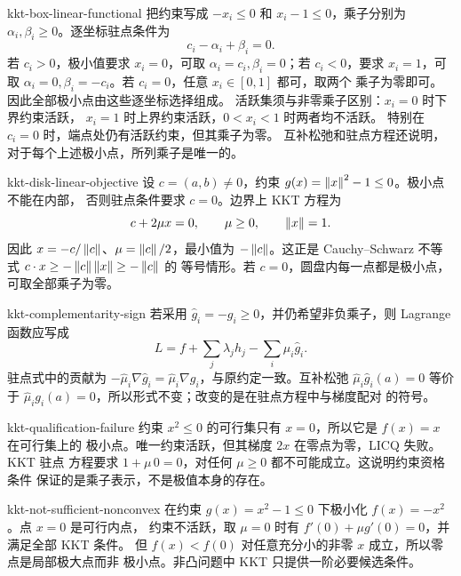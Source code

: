 \begin{solution}{kkt-box-linear-functional}
把约束写成 $-x_i\le0$ 和 $x_i-1\le0$，乘子分别为
$\alpha_i,\beta_i\ge0$。逐坐标驻点条件为
\[
 c_i-\alpha_i+\beta_i=0.
\]
若 $c_i>0$，极小值要求 $x_i=0$，可取
$\alpha_i=c_i,\beta_i=0$；若 $c_i<0$，要求 $x_i=1$，可取
$\alpha_i=0,\beta_i=-c_i$。若 $c_i=0$，任意 $x_i\in[0,1]$ 都可，取两个
乘子为零即可。因此全部极小点由这些逐坐标选择组成。
活跃集须与非零乘子区别：\(x_i=0\) 时下界约束活跃，
\(x_i=1\) 时上界约束活跃，\(0<x_i<1\) 时两者均不活跃。
特别在 \(c_i=0\) 时，端点处仍有活跃约束，但其乘子为零。
互补松弛和驻点方程还说明，对于每个上述极小点，所列乘子是唯一的。
\end{solution}

\begin{solution}{kkt-disk-linear-objective}
设 $c=(a,b)\ne0$，约束 $g(x)=\left\lVert x\right\rVert^2-1\le0$。极小点不能在内部，
否则驻点条件要求 $c=0$。边界上 KKT 方程为
\[
 c+2\mu x=0,\qquad \mu\ge0,\qquad \left\lVert x\right\rVert=1.
\]
因此 $x=-c/\left\lVert c\right\rVert$、$\mu=\left\lVert c\right\rVert/2$，最小值为 $-\left\lVert c\right\rVert$。这正是
Cauchy--Schwarz 不等式 $c\cdot x\ge-\left\lVert c\right\rVert\left\lVert x\right\rVert\ge-\left\lVert c\right\rVert$ 的
等号情形。若 $c=0$，圆盘内每一点都是极小点，可取全部乘子为零。
\end{solution}

\begin{solution}{kkt-complementarity-sign}
若采用 $\widehat g_i=-g_i\ge0$，并仍希望非负乘子，则 Lagrange 函数应写成
\[
 L=f+\sum_j\lambda_jh_j-\sum_i\widehat\mu_i\widehat g_i.
\]
驻点式中的贡献为
$-\widehat\mu_i\nabla\widehat g_i
=\widehat\mu_i\nabla g_i$，与原约定一致。互补松弛
$\widehat\mu_i\widehat g_i(a)=0$ 等价于
$\widehat\mu_i g_i(a)=0$，所以形式不变；改变的是在驻点方程中与梯度配对
的符号。
\end{solution}

\begin{solution}{kkt-qualification-failure}
约束 $x^2\le0$ 的可行集只有 $x=0$，所以它是 $f(x)=x$ 在可行集上的
极小点。唯一约束活跃，但其梯度 $2x$ 在零点为零，LICQ 失败。KKT 驻点
方程要求
$1+\mu\,0=0$，对任何 $\mu\ge0$ 都不可能成立。这说明约束资格条件
保证的是乘子表示，不是极值本身的存在。
\end{solution}

\begin{solution}{kkt-not-sufficient-nonconvex}
在约束 $g(x)=x^2-1\le0$ 下极小化 $f(x)=-x^2$。点 $x=0$ 是可行内点，
约束不活跃，取 $\mu=0$ 时有 $f'(0)+\mu g'(0)=0$，并满足全部 KKT 条件。
但 $f(x)<f(0)$ 对任意充分小的非零 $x$ 成立，所以零点是局部极大点而非
极小点。非凸问题中 KKT 只提供一阶必要候选条件。
\end{solution}

